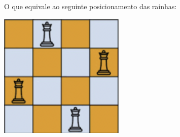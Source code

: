 \documentclass{article}
\begin{document}
O que equivale ao seguinte posicionamento das rainhas:

\begin{center}
\par \includegraphics[width=6cm, height=6cm]{solution.png} \par
\end{center}
\end{document}
